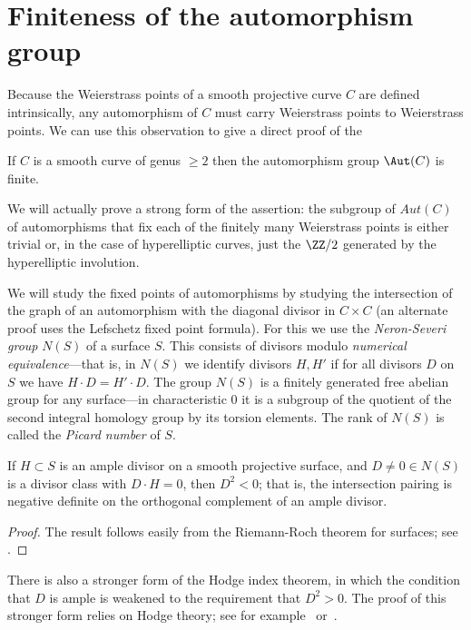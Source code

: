 \section{Finiteness of the automorphism group}\label{finiteness section}

Because the Weierstrass points of a smooth projective curve $C$ are defined intrinsically, any automorphism of $C$ must carry Weierstrass points to Weierstrass points. We can use this observation to give a direct proof of the

\begin{theorem}\label{finite autos}
If $C$ is a smooth curve of genus $\geq 2$ then the automorphism group $\Aut(C)$ is finite.
\end{theorem}

We will actually prove a strong form of the assertion: the subgroup of $Aut(C)$ of automorphisms that fix each  of the finitely many Weierstrass points is either
 trivial or, in the case of hyperelliptic curves, just the $\ZZ/2$ generated by the hyperelliptic involution.
    
We will study the fixed points of automorphisms by studying the intersection of the graph of
an automorphism with the diagonal divisor in $C\times C$ (an alternate proof uses the Lefschetz fixed point formula). For this we use the
\emph{Neron-Severi group} $N(S)$ of a surface $S$. This consists of divisors modulo \emph{numerical equivalence}---that is, in $N(S)$ we identify divisors $H, H'$ if for all divisors $D$ on $S$ we have $H\cdot D = H'\cdot D$. The group
$N(S)$ is a  finitely generated free abelian group for any surface---in characteristic 0 it is a subgroup of the quotient of the second integral homology group by its torsion elements. The rank of $N(S)$ is called the \emph{Picard number} of $S$. 

\begin{theorem}\label{hodge index}
If $H\subset S$ is an ample divisor on a smooth projective surface, and $D \neq 0 \in N(S)$ is a divisor class with $D\cdot H = 0$, then 
$D^2<0$; that is, the intersection pairing is negative definite on the orthogonal complement of an
ample divisor.
\end{theorem}
\begin{proof}
The result follows easily from the Riemann-Roch theorem for surfaces; see \cite[Theorem V.1.9]{Hartshorne1977}.  
\end{proof}

There is also a stronger form of the Hodge index theorem, in which the condition that $D$ is ample is weakened to the requirement that $D^2 > 0$. The proof of this stronger form relies on Hodge theory; see for example~\cite{MR1997577} or~\cite{Griffiths-Harris1978}.


